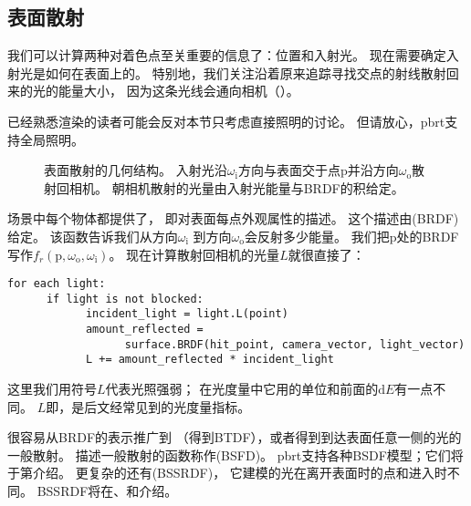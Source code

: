 \subsection{表面散射}\label{sub:表面散射}
我们可以计算两种对着色点至关重要的信息了：位置和入射光。
现在需要确定入射光是如何在表面上的。
特别地，我们关注沿着原来追踪寻找交点的射线散射回来的光的能量大小，
因为这条光线会通向相机（）。
\begin{remark}
      已经熟悉渲染的读者可能会反对本节只考虑直接照明的讨论。
      但请放心，pbrt支持全局照明。
\end{remark}
\begin{figure}
      \centering
      \caption{表面散射的几何结构。
            入射光沿$\omega_\mathrm{i}$方向与表面交于点p并沿方向$\omega_\mathrm{o}$散射回相机。
            朝相机散射的光量由入射光能量与BRDF的积给定。}\label{fig:1.6}
\end{figure}

场景中每个物体都提供了，
即对表面每点外观属性的描述。
这个描述由(BRDF)给定。
该函数告诉我们从方向$\omega_\mathrm{i}$
到方向$\omega_\mathrm{o}$会反射多少能量。
我们把p处的BRDF写作$f_r({\mathrm p},\omega_\mathrm{o},\omega_\mathrm{i})$。
现在计算散射回相机的光量$L$就很直接了：
\begin{lstlisting}
for each light:
      if light is not blocked:
            incident_light = light.L(point)
            amount_reflected =
                  surface.BRDF(hit_point, camera_vector, light_vector)
            L += amount_reflected * incident_light
\end{lstlisting}
这里我们用符号$L$代表光照强弱；
在光度量中它用的单位和前面的$\mathrm{d}E$有一点不同。
$L$即，是后文经常见到的光度量指标。

很容易从BRDF的表示推广到
（得到BTDF），或者得到到达表面任意一侧的光的一般散射。
描述一般散射的函数称作(BSFD)。
pbrt支持各种BSDF模型；它们将于第介绍。
更复杂的还有(BSSRDF)，
它建模的光在离开表面时的点和进入时不同。
BSSRDF将在、和介绍。

